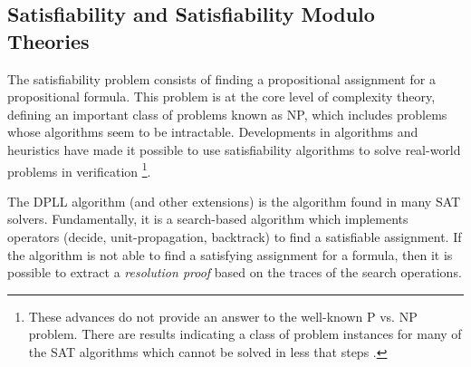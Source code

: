 \subsection{Satisfiability and Satisfiability Modulo Theories}

The satisfiability problem consists of finding a 
propositional assignment for a propositional formula. 
This problem is at the core level of complexity theory, 
defining an important class of problems known as 
NP, which includes problems whose
algorithms seem to be intractable.
Developments in algorithms and heuristics 
\cite{10.5555/2898950, 
935565} have made it possible to use satisfiability 
algorithms 
to solve real-world problems in 
verification \footnote{These
  advances do not provide an answer to the well-known P vs. NP
  problem. There are results indicating a class of problem instances
  for many of the SAT algorithms which cannot be solved in less that
   steps \cite{10.5555/2898950}.
}.

The DPLL algorithm \cite{10.1145/368273.368557} 
(and other extensions) is the algorithm
found in many SAT solvers. Fundamentally, it is a search-based algorithm
which implements operators (decide, unit-propagation, backtrack)
to find a satisfiable assignment. If the algorithm is not able to
find a satisfying assignment for a formula, then it is possible to 
extract a \emph{resolution proof} based on the traces of the search
operations.

